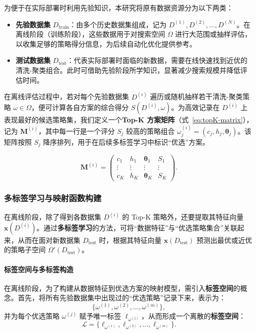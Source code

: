 \documentclass[10pt]{article} %
\numberwithin{equation}{section}
\begin{document}
为便于在实际部署时利用先验知识，本研究将原有数据资源分为以下两类：
\begin{itemize}
    \item \textbf{先验数据集} $D_{\text{train}}$：由多个历史数据集组成，记为 ${D^{(1)}, D^{(2)}, \dots, D^{(N)}}$。在离线阶段（训练阶段），这些数据用于对搜索空间 $\Omega$ 进行大范围或抽样评估，以收集足够的策略得分信息，为后续自动化优化提供参考。
    \item \textbf{测试数据集} $D_{\text{test}}$：代表实际部署时面临的新数据，需要在线快速找到近优的清洗-聚类组合。此时可借助先验阶段所学知识，显著减少搜索规模并降低评估时间。
\end{itemize}

在离线评估过程中，若对每个先验数据集 $D^{(i)}$ 遍历或随机抽样若干清洗-聚类策略 $\omega \in \Omega$，便可计算各自方案的综合得分 $S(D^{(i)}, \omega)$。为高效记录在 $D^{(i)}$ 上表现最好的候选策略集，我们定义一个\textbf{Top-K 方案矩阵}（式~\eqref{eq:topK-matrix}），记为 $\mathbf{M}^{(i)}$，其中每一行是一个评分 $S_j$ 较高的策略组合 $\omega_j^{(i)}=(c_j,h_j,\boldsymbol{\theta}_j)$。该矩阵按照 $S_j$ 降序排列，用于在后续多标签学习中标识“优选”方案。

\begin{equation}\label{eq:topK-matrix}
\mathbf{M}^{(i)} 
= 
\begin{pmatrix}
c_1 & h_1 & \boldsymbol{\theta}_1 & S_1 \\
\vdots & \vdots & \vdots & \vdots \\
c_K & h_K & \boldsymbol{\theta}_K & S_K
\end{pmatrix}.
\end{equation}

\subsubsection{多标签学习与映射函数构建}
\label{subsec:multi-label}

在离线阶段，除了得到各数据集 $D^{(i)}$ 的 Top-K 策略外，还要提取其特征向量 $\mathbf{x}(D^{(i)})$。通过\textbf{多标签学习}的方法，可将“数据特征”与“优选策略集合”关联起来，从而在面对新数据集 $D_{\text{test}}$ 时，根据其特征向量 $\mathbf{x}(D_{\text{test}})$ 预测出最优或近优的策略子空间 $\Omega'(D_{\text{test}})$。

\paragraph{标签空间与多标签构造}  
在离线阶段，为了构建从数据特征到优选方案的映射模型，需引入\textbf{标签空间}的概念。首先，将所有先验数据集中出现过的“优选策略”记录下来，表示为：
\[
\{\omega^{(1)}, \omega^{(2)}, \ldots, \omega^{(m)}\},
\]
并为每个优选策略 $\omega^{(j)}$ 赋予唯一标签 $\ell_{\omega^{(j)}}$，从而形成一个离散的\textbf{标签空间}：
\begin{equation}\label{eq:label-space}
\mathcal{L}
= \{\ell_{\omega^{(1)}}, \ell_{\omega^{(2)}}, \ldots, \ell_{\omega^{(m)}}\}.
\end{equation}
\end{document}
